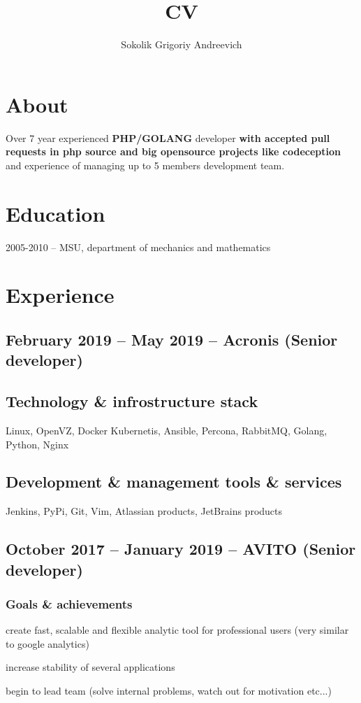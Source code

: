 \documentclass[9pt, a4paper, english]{extarticle}
\title {CV}
\author{Sokolik Grigoriy Andreevich}
\begin{document}
\maketitle

\section* {About}
Over 7 year experienced \textbf{PHP/GOLANG} developer \textbf{with accepted pull requests in php source and big opensource projects like codeception} and experience of managing up to 5 members development team.

\section* {Education}
2005-2010 -- MSU, department of mechanics and mathematics


\section* {Experience}

  \subsection* {February 2019 -- May 2019 -- \textbf{Acronis} (Senior developer)}
    \subsection* {Technology \& infrostructure stack}
      Linux, OpenVZ, Docker Kubernetis, Ansible, Percona, RabbitMQ, Golang, Python, Nginx
    \subsection* {Development \& management tools \& services}
      Jenkins, PyPi, Git, Vim, Atlassian products, JetBrains products


  \subsection* {October 2017 -- January 2019 -- \textbf{AVITO} (Senior developer)}
    \subsubsection* {Goals \& achievements}
      \begin {list}{\textbullet}{\itemsep=0mm}
        \item create fast, scalable and flexible analytic tool for professional users (very similar to google analytics)
        \item increase stability of several applications
        \item begin to lead team (solve internal problems, watch out for motivation etc...)
      \end{list}
\end{document}

